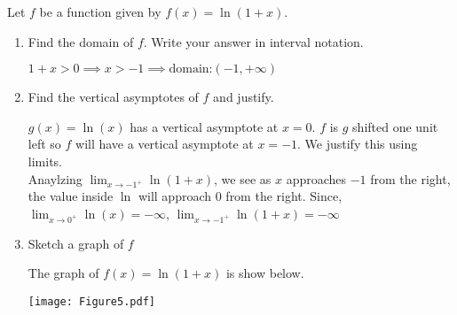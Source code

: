 \documentclass[nooutcomes]{ximera}
\begin{document}
\begin{problem}
Let $f$ be a function given by $f(x)=\ln(1+x)$.

	\begin{enumerate}
	\item Find the domain of $f$.  Write your answer in interval notation.
	\begin{freeResponse}
	$1+x>0 \implies x>-1 \implies \text{domain:}(-1,+\infty)$
	\end{freeResponse}
	
	\item Find the vertical asymptotes of $f$ and justify.
	\begin{freeResponse}
	$g(x)=\ln(x)$ has a vertical asymptote at $x=0$.  $f$ is $g$ shifted one unit left so $f$ will have a vertical asymptote at $x=-1$.  We justify this using limits.\\
	Anaylzing $\lim_{x \to -1^+} \ln(1+x)$, we see as $x$ approaches $-1$ from the right, the value inside $\ln$ will approach $0$ from the right.  
	Since, $\lim_{x \to 0^+}\ln(x)=-\infty$, $\lim_{x \to -1^+} \ln(1+x)=-\infty$
	
	\end{freeResponse}

	\item Sketch a graph of $f$

	\begin{freeResponse} The graph of $f(x)=\ln(1+x)$ is show below.
  \begin{center}
    \texttt{[image: Figure5.pdf]}
  \end{center}
	\end{freeResponse}
\end{enumerate}

\end{problem}
\end{document}

